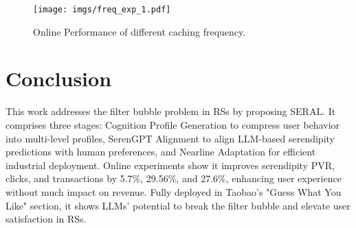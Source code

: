\begin{figure}[h]
    \centering
    \vspace{-5pt}
    \texttt{[image: imgs/freq\_exp\_1.pdf]}
    \vspace{-25pt}
    \caption{Online Performance of different caching frequency.}
    \vspace{-15pt}
    \label{fig:cache}
\end{figure}



\section{Conclusion}
This work addresses the filter bubble problem in RSs by proposing  SERAL. It comprises three stages: Cognition Profile Generation to compress user behavior into multi-level profiles, SerenGPT Alignment to align LLM-based serendipity predictions with human preferences, and Nearline Adaptation for efficient industrial deployment. Online experiments show it improves serendipity PVR, clicks, and transactions by 5.7\%, 29.56\%, and 27.6\%, enhancing user experience without much impact on revenue. Fully deployed in Taobao’s "Guess What You Like" section, it shows LLMs' potential to break the filter bubble and elevate user satisfaction in RSs.
